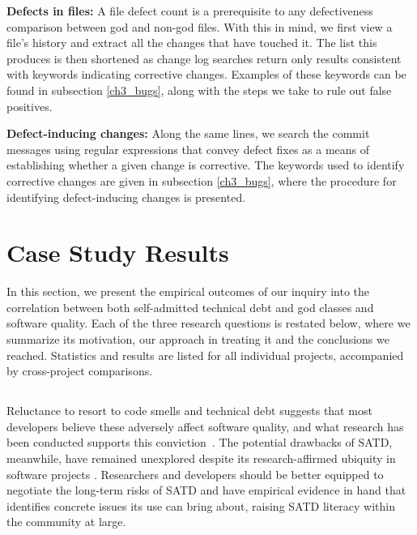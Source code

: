 \noindent\textbf{Defects in files:}
A file defect count is a prerequisite to any defectiveness comparison between god and non-god files. With this in mind, we first view a file's history and extract all the changes that have touched it. The list this produces is then shortened as change log searches return only results consistent with keywords indicating corrective changes.
Examples of these keywords can be found in subsection \ref{ch3_bugs}, along with the steps we take to rule out false positives.


\noindent \textbf{Defect-inducing changes:}
\revision Along the same lines, we search the commit messages using regular expressions that convey defect fixes as a means of establishing whether a given change is corrective. The keywords used to identify corrective changes are given in subsection \ref{ch3_bugs}, where the procedure for identifying defect-inducing changes is presented.

\section{Case Study Results}
\label{chap4:sec:case_study_results}

In this section, we present the empirical outcomes of our inquiry into the correlation between both self-admitted technical debt and god classes and software quality. Each of the three research questions is restated below, where we summarize its motivation, our approach in treating it and the conclusions we reached. Statistics and results are listed for all individual projects, accompanied by cross-project comparisons.

\subsection*{\chapterIVrqI}


Reluctance to resort to code smells and technical debt suggests that most developers believe these adversely affect software quality, and what research has been conducted supports this conviction~\cite{zazworka2011investigating}. %
The potential drawbacks of SATD, meanwhile, have remained unexplored despite its research-affirmed ubiquity in software projects \cite{ICSM_PotdarS14}. Researchers and developers should be better equipped to negotiate the long-term risks of SATD and have empirical evidence in hand that identifies concrete issues its use can bring about, raising SATD literacy within the community at large.



